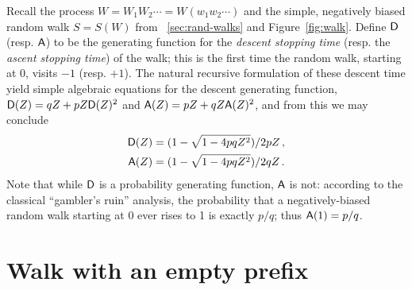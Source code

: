   Recall the process $W = W_1 W_2 \cdots = W(w_1 w_2 \cdots)$ 
  and the simple, negatively biased random walk $S = S(W)$ 
  from \Section~\ref{sec:rand-walks} and Figure~\ref{fig:walk}.
  Define $\mathsf{D}$ (resp. $\mathsf{A}$) to be
  the generating function for the \emph{descent stopping time} 
  (resp. the \emph{ascent stopping time}) 
  of the walk; this is the first time the random walk, starting at 0, visits
  $-1$ (resp. $+1$). 
  The natural recursive formulation of these descent time yield 
  simple algebraic equations for the descent generating function,
  $\mathsf{D}(Z) = qZ + pZ \mathsf{D}(Z)^2$ and $\mathsf{A}(Z) = pZ + qZ \mathsf{A}(Z)^2$, 
  and from this we may conclude
  \begin{align*}
    \mathsf{D}(Z) &= (1 - \sqrt{1 - 4pqZ^2})/2pZ\,, \\
    \mathsf{A}(Z) &= (1 - \sqrt{1 - 4pqZ^2})/2qZ\,.
  \end{align*}
  Note that while $\mathsf{D}$ is a probability generating function, 
  $\mathsf{A}$ is not: according to the classical
  ``gambler's ruin'' analysis,
  the probability
  that a negatively-biased random walk starting at 0 ever rises to 1
  is exactly $p/q$; thus $\mathsf{A}(1) = p/q$.






\section{Walk with an empty prefix}\label{sec:catalan-estimates}




